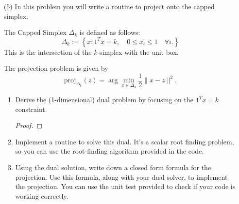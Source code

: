 \documentclass[11pt]{amsart}
\begin{document}
\vskip 16pt
\begin{enumerate}
\item[(5)] In this problem you will write a routine to project onto the capped simplex. 

The Capped Simplex $\Delta_k$ is defined as follows: 
\[
\Delta_k := \left\{x: 1^Tx = k, \quad 0 \leq x_i \leq 1 \quad \forall i. \right\}
\]
This is the intersection of the $k$-simplex with the unit box. 

The projection problem is given by 
\[
\mbox{proj}_{\Delta_k}(z) = \arg\min_{x \in \Delta_k} \frac{1}{2}\|x-z\|^2.
\]
\begin{enumerate}
\item Derive the (1-dimensional) dual problem by focusing on the $1^Tx = k$ constraint. 
  \begin{proof}
  \end{proof}
\item Implement a routine to solve this dual. It's a scalar root finding problem, 
so you can use the root-finding algorithm provided in the code.
\bigskip \bigskip
\item Using the dual solution, write down a closed form formula for the projection.  
Use this formula, along with your dual solver, to implement the projection. You can use the unit test 
provided to check if your code is working correctly. 


\end{enumerate}




\end{enumerate}
\end{document}
